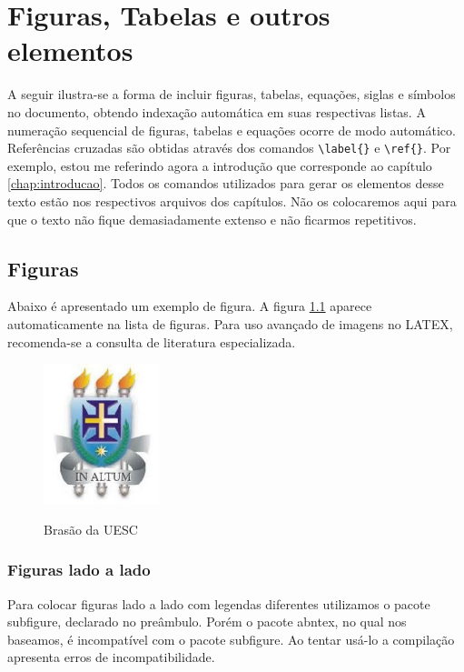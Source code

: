 
\chapter{Figuras, Tabelas e outros elementos}\label{chap:fundamentacaoTeorica}
A seguir ilustra-se a forma de incluir figuras, tabelas, equações, siglas e símbolos no documento, obtendo indexação automática em suas respectivas listas.
A numeração sequencial de figuras, tabelas e equações ocorre de modo automático.
Referências cruzadas são obtidas através dos comandos \verb#\label{}# e \verb#\ref{}#.
Por exemplo, estou me referindo agora a introdução que corresponde ao  capítulo \ref{chap:introducao}. Todos os comandos utilizados para gerar os elementos desse texto estão nos respectivos arquivos dos capítulos. Não os colocaremos aqui para que o texto não fique demasiadamente extenso e não ficarmos repetitivos.

\section{Figuras}
\label{sec:figuras}

Abaixo é apresentado um exemplo de figura. A  figura \ref{fig:brasaouesc} aparece automaticamente na lista de figuras. Para uso avançado de imagens no LATEX, recomenda-se a consulta de literatura especializada.

\begin{figure}[!htb]
\centering
	\includegraphics[width=0.3\textwidth]{./04-figuras/brasaouesc}\label{fig:brasaouesc}
    \caption{Brasão da UESC}\vspace{-0.4cm}

\end{figure}

\subsection{Figuras lado a lado}\label{figladoalado}
Para colocar figuras lado a lado com legendas diferentes utilizamos o pacote {\ttfamily subfigure}, declarado no preâmbulo. Porém o pacote abntex, no qual nos baseamos, é incompatível com o pacote {\ttfamily subfigure}. Ao tentar usá-lo a compilação apresenta erros de incompatibilidade. 

